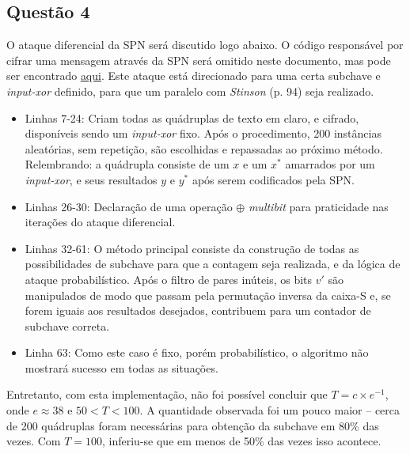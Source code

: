 \documentclass{article}
\begin{document}
\subsection*{Questão 4}
O ataque diferencial da SPN será discutido logo abaixo. O código responsável por cifrar uma mensagem através da SPN será omitido neste documento, mas pode ser encontrado \href{https://raw.githubusercontent.com/zambonin/UFSC-INE5451/master/q4_spn.py}{aqui}. Este ataque está direcionado para uma certa subchave e \textit{input-xor} definido, para que um paralelo com \textit{Stinson} (p. 94) seja realizado.

\begin{itemize}
    \item Linhas 7-24: Criam todas as quádruplas de texto em claro, e cifrado, disponíveis sendo um \textit{input-xor} fixo. Após o procedimento, 200 instâncias aleatórias, sem repetição, são escolhidas e repassadas ao próximo método. Relembrando: a quádrupla consiste de um $x$ e um $x^*$ amarrados por um \textit{input-xor}, e seus resultados $y$ e $y^*$ após serem codificados pela SPN.
    \item Linhas 26-30: Declaração de uma operação $\oplus$ \textit{multibit} para praticidade nas iterações do ataque diferencial.
    \item Linhas 32-61: O método principal consiste da construção de todas as possibilidades de subchave para que a contagem seja realizada, e da lógica de ataque probabilístico. Após o filtro de pares inúteis, os bits $v'$ são manipulados de modo que passam pela permutação inversa da caixa-S e, se forem iguais aos resultados desejados, contribuem para um contador de subchave correta.
    \item Linha 63: Como este caso é fixo, porém probabilístico, o algoritmo não mostrará sucesso em todas as situações.
\end{itemize} 

Entretanto, com esta implementação, não foi possível concluir que $T = c \times e^{-1}$, onde $e \approx 38$ e $50 < T < 100$. A quantidade observada foi um pouco maior -- cerca de 200 quádruplas foram necessárias para obtenção da subchave em 80\% das vezes. Com $T = 100$, inferiu-se que em menos de 50\% das vezes isso acontece.
\end{document}
